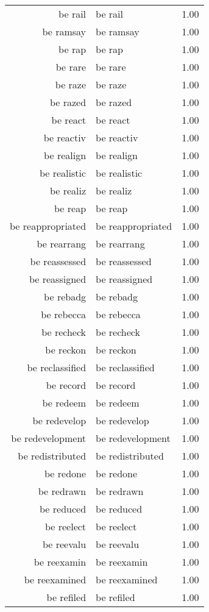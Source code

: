 \begin{table}[ht]
\begin{tabular}{rlr}
  be rail & be rail & 1.00 \\ 
  be ramsay & be ramsay & 1.00 \\ 
  be rap & be rap & 1.00 \\ 
  be rare & be rare & 1.00 \\ 
  be raze & be raze & 1.00 \\ 
  be razed & be razed & 1.00 \\ 
  be react & be react & 1.00 \\ 
  be reactiv & be reactiv & 1.00 \\ 
  be realign & be realign & 1.00 \\ 
  be realistic & be realistic & 1.00 \\ 
  be realiz & be realiz & 1.00 \\ 
  be reap & be reap & 1.00 \\ 
  be reappropriated & be reappropriated & 1.00 \\ 
  be rearrang & be rearrang & 1.00 \\ 
  be reassessed & be reassessed & 1.00 \\ 
  be reassigned & be reassigned & 1.00 \\ 
  be rebadg & be rebadg & 1.00 \\ 
  be rebecca & be rebecca & 1.00 \\ 
  be recheck & be recheck & 1.00 \\ 
  be reckon & be reckon & 1.00 \\ 
  be reclassified & be reclassified & 1.00 \\ 
  be record & be record & 1.00 \\ 
  be redeem & be redeem & 1.00 \\ 
  be redevelop & be redevelop & 1.00 \\ 
  be redevelopment & be redevelopment & 1.00 \\ 
  be redistributed & be redistributed & 1.00 \\ 
  be redone & be redone & 1.00 \\ 
  be redrawn & be redrawn & 1.00 \\ 
  be reduced & be reduced & 1.00 \\ 
  be reelect & be reelect & 1.00 \\ 
  be reevalu & be reevalu & 1.00 \\ 
  be reexamin & be reexamin & 1.00 \\ 
  be reexamined & be reexamined & 1.00 \\ 
  be refiled & be refiled & 1.00 \\ 

\end{tabular}
\end{table}

